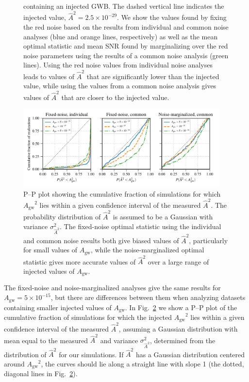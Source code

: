 \documentclass[twocolumn,aps,prd,superscriptaddress]{revtex4-1}
\newcommand{\Agw}{\ensuremath{A_\mathrm{gw}}}
\begin{document}
\begin{figure}[tb]
{			containing an injected GWB. 
			The dashed vertical line indicates the injected value, $\hat{A}^2 = 2.5 \times 10^{-29}$. 
			We show the values found by fixing the red noise 
			based on the results from individual and common noise analyses 
			(blue and orange lines, respectively) 
			as well as the mean optimal statistic and mean SNR found by marginalizing over 
			the red noise parameters using the results of a common noise analysis (green lines). 
			Using the red noise values from individual noise analyses leads to values of $\hat{A}^2$ 
			that are significantly lower than the injected value, 
			while using the values from a common noise analysis gives values of $\hat{A}^2$ 
			that are closer to the injected value.}
	\label{fig:os_datasetstats}
\end{figure}

\begin{figure}[htb]
	\includegraphics[width=0.95\textwidth]{plots/pp_plot.pdf}
	\caption{P--P plot showing the cumulative fraction of simulations for which $\Agw^2$ lies within 
			a given confidence interval of the measured $\hat{A}^2$. 
			The probability distribution of $\hat{A}^2$ is assumed to be a Gaussian 
			with variance $\sigma^2_{\hat{A}^2}$. 
			The fixed-noise optimal statistic using the individual and common noise results 
			both give biased values of $\hat{A}^2$, particularly for small values of \Agw, 
			while the noise-marginalized optimal statistic gives more accurate values of $\hat{A}^2$ 
			over a large range of injected values of \Agw.}
	\label{fig:os_compare}
\end{figure}

The fixed-noise and noise-marginalized analyses give the same results 
for $\Agw = 5\times10^{-15}$, 
but there are differences between them when analyzing datasets 
containing smaller injected values of $\Agw$. 
In Fig.~\ref{fig:os_compare} we show a P--P plot 
of the cumulative fraction of simulations for which the injected $\Agw^2$ lies within 
a given confidence interval of the measured $\hat{A}^2$, 
assuming a Gaussian distribution with mean equal to the measured $\hat{A}^2$ 
and variance $\sigma^2_{\hat{A}^2}$, 
determined from the distribution of $\hat{A}^2$ for our simulations. 
If $\hat{A}^2$ has a Gaussian distribution centered around $\Agw^2$, 
the curves should lie along a straight line with slope 1 (the dotted, diagonal lines in Fig.~\ref{fig:os_compare}).
\end{document}
